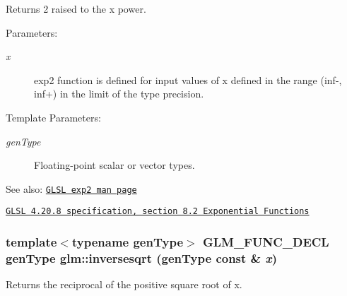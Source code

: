 Returns 2 raised to the x power.

\begin{Desc}
\item[Parameters:]
\begin{description}
\item[{\em x}]exp2 function is defined for input values of x defined in the range (inf-, inf+) in the limit of the type precision. \end{description}
\end{Desc}
\begin{Desc}
\item[Template Parameters:]
\begin{description}
\item[{\em genType}]Floating-point scalar or vector types.\end{description}
\end{Desc}
\begin{Desc}
\item[See also:]\href{http://www.opengl.org/sdk/docs/manglsl/xhtml/exp2.xml}{\tt GLSL exp2 man page} 

\href{http://www.opengl.org/registry/doc/GLSLangSpec.4.20.8.pdf}{\tt GLSL 4.20.8 specification, section 8.2 Exponential Functions} \end{Desc}
\hypertarget{group__core__func__exponential_ga190c750b7eefaeb15431987d41177d1}{
\subsubsection[inversesqrt]{\setlength{\rightskip}{0pt plus 5cm}template$<$typename genType$>$ GLM\_\-FUNC\_\-DECL genType glm::inversesqrt (genType const \& {\em x})}}
\label{group__core__func__exponential_ga190c750b7eefaeb15431987d41177d1}


Returns the reciprocal of the positive square root of x.


